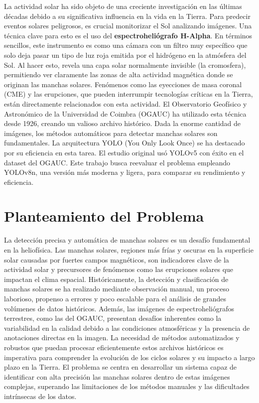 \documentclass[journal]{IEEEtran}
\begin{document}
La actividad solar ha sido objeto de una creciente investigación en las últimas décadas debido a su significativa influencia en la vida en la Tierra. Para predecir eventos solares peligrosos, es crucial monitorizar el Sol analizando imágenes. Una técnica clave para esto es el uso del \textbf{espectroheliógrafo H-Alpha}. En términos sencillos, este instrumento es como una cámara con un filtro muy específico que solo deja pasar un tipo de luz roja emitida por el hidrógeno en la atmósfera del Sol. Al hacer esto, revela una capa solar normalmente invisible (la cromosfera), permitiendo ver claramente las zonas de alta actividad magnética donde se originan las manchas solares. Fenómenos como las eyecciones de masa coronal (CME) y las erupciones, que pueden interrumpir tecnologías críticas en la Tierra, están directamente relacionados con esta actividad. El Observatorio Geofísico y Astronómico de la Universidad de Coimbra (OGAUC) ha utilizado esta técnica desde 1926, creando un valioso archivo histórico. Dada la enorme cantidad de imágenes, los métodos automáticos para detectar manchas solares son fundamentales. La arquitectura YOLO (You Only Look Once) se ha destacado por su eficiencia en esta tarea. El estudio original \cite{Santos2023} usó YOLOv5 con éxito en el dataset del OGAUC. Este trabajo busca reevaluar el problema empleando YOLOv8n, una versión más moderna y ligera, para comparar su rendimiento y eficiencia.


\section{Planteamiento del Problema}
La detección precisa y automática de manchas solares es un desafío fundamental en la heliofísica. Las manchas solares, regiones más frías y oscuras en la superficie solar causadas por fuertes campos magnéticos, son indicadores clave de la actividad solar y precursores de fenómenos como las erupciones solares que impactan el clima espacial. Históricamente, la detección y clasificación de manchas solares se ha realizado mediante observación manual, un proceso laborioso, propenso a errores y poco escalable para el análisis de grandes volúmenes de datos históricos. Además, las imágenes de espectroheliógrafos terrestres, como las del OGAUC, presentan desafíos inherentes como la variabilidad en la calidad debido a las condiciones atmosféricas y la presencia de anotaciones directas en la imagen. La necesidad de métodos automatizados y robustos que puedan procesar eficientemente estos archivos históricos es imperativa para comprender la evolución de los ciclos solares y su impacto a largo plazo en la Tierra. El problema se centra en desarrollar un sistema capaz de identificar con alta precisión las manchas solares dentro de estas imágenes complejas, superando las limitaciones de los métodos manuales y las dificultades intrínsecas de los datos.
\end{document}
